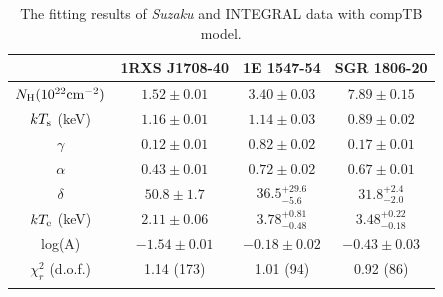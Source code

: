 \documentclass[]{raa}
\begin{document}
\begin{table}
\bc
\begin{minipage}[]{100mm}
\caption[]{The fitting results of {\it Suzaku} and INTEGRAL data with compTB model.  
\label{fit_si}}
\end{minipage}
 \begin{tabular}{cccc}
  \hline\noalign{\smallskip}
 & 1RXS J1708-40 & 1E 1547-54 & SGR 1806-20 \\
  \hline\noalign{\smallskip}
$N_{\rm H} (10^{22} {\rm cm}^{-2})$ & $1.52 \pm 0.01$ & $3.40 \pm 0.03$ & $7.89 \pm 0.15$\\
$kT_{\rm s}$ (keV) & $1.16 \pm 0.01$ & $1.14 \pm 0.03$ & $0.89 \pm 0.02$ \\ %
$\gamma$ & $0.12 \pm 0.01$ & $0.82 \pm 0.02$ & $0.17 \pm 0.01$ \\ %
$\alpha$ & $0.43 \pm 0.01$ & $0.72 \pm 0.02$ & $0.67 \pm 0.01$ \\%
$\delta$ & $50.8 \pm 1.7$ & $36.5_{-5.6}^{+29.6}$ & $31.8_{-2.0}^{+2.4}$ \\%
$kT_{\rm e}$ (keV) & $2.11 \pm 0.06$ & $3.78_{-0.48}^{+0.81}$ & $3.48_{-0.18}^{+0.22}$ \\ %
log(A) & $-1.54 \pm 0.01$ & $-0.18 \pm 0.02$ & $-0.43 \pm 0.03$ \\ %
$\chi_r^2$ (d.o.f.) & 1.14 (173) & 1.01 (94) & 0.92 (86) \\ %
  \noalign{\smallskip}\hline
\end{tabular}
\ec
\end{table}
\end{document}
